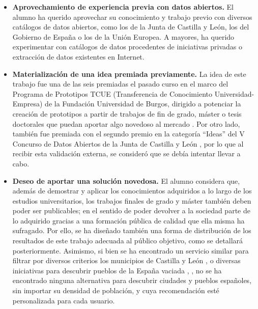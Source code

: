 \begin{itemize}
    \item \textbf{Aprovechamiento de experiencia previa con datos abiertos.} El alumno ha querido aprovechar su conocimiento y trabajo previo con diversos catálogos de datos abiertos, como los de la Junta de Castilla y León, los del Gobierno de España o los de la Unión Europea. A mayores, ha querido experimentar con catálogos de datos procedentes de iniciativas privadas o extracción de datos existentes en Internet.
    \item \textbf{Materialización de una idea premiada previamente.} La idea de este trabajo fue una de las seis premiadas el pasado curso en el marco del Programa de Prototipos TCUE (Transferencia de Conocimiento Universidad-Empresa) de la Fundación Universidad de Burgos, dirigido a potenciar la creación de prototipos a partir de trabajos de fin de grado, máster o tesis doctorales que puedan aportar algo novedoso al mercado \cite{ubu}. Por otro lado, también fue premiada con el segundo premio en la categoría ``Ideas'' del V Concurso de Datos Abiertos de la Junta de Castilla y León \cite{cyl}, por lo que al recibir esta validación externa, se consideró que se debía intentar llevar a cabo. 
    \item \textbf{Deseo de aportar una solución novedosa.} El alumno considera que, además de demostrar y aplicar los conocimientos adquiridos a lo largo de los estudios universitarios, los trabajos finales de grado y máster también deben poder ser publicables; en el sentido de poder devolver a la sociedad parte de lo adquirido gracias a una formación pública de calidad que ella misma ha sufragado. Por ello, se ha diseñado también una forma de distribución de los resultados de este trabajo adecuada al público objetivo, como se detallará posteriormente. Asimismo, si bien se ha encontrado un servicio similar para filtrar por diversos criterios los municipios de Castilla y León \cite{repueblame}, o diversas iniciativas para descubrir pueblos de la España vaciada \cite{apadrina_un_pueblo}, \cite{pueblos_magicos}, no se ha encontrado ninguna alternativa para descubrir ciudades y pueblos españoles, sin importar su densidad de población, y cuya recomendación esté personalizada para cada usuario.
 \end{itemize}
